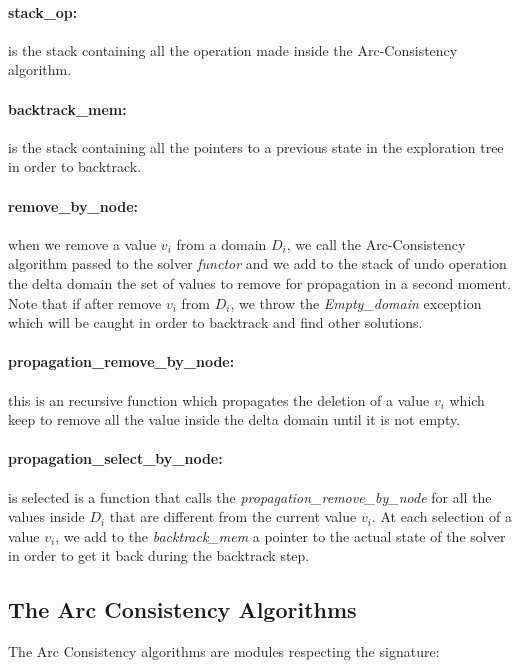 \documentclass{rapport}
\begin{document}
\paragraph{stack\_op:} is the stack containing all the operation made inside the Arc-Consistency algorithm.

\paragraph{backtrack\_mem:} is the stack containing all the pointers to a previous state in the exploration tree in order to backtrack.

\paragraph{remove\_by\_node:} when we remove a value $v_i$ from a domain $D_i$, we call the Arc-Consistency algorithm passed to the solver \textit{functor} and we add to the stack of undo operation the delta domain the set of values to remove for propagation in a second moment. Note that if after remove $v_i$ from $D_i$, we throw the \textit{Empty\_domain} exception which will be caught in order to backtrack and find other solutions.

\paragraph{propagation\_remove\_by\_node:} this is an recursive function which propagates the deletion of a value $v_i$ which keep to remove all the value inside the delta domain until it is not empty.

\paragraph{propagation\_select\_by\_node:} is selected is a function that calls the \textit{propagation\_remove\_by\_node} for all the values inside $D_i$ that are different from the current value $v_i$. At each selection of a value $v_i$, we add to the \textit{backtrack\_mem} a pointer to the actual state of the solver in order to get it back during the backtrack step.

\subsection{The Arc Consistency Algorithms}
The Arc Consistency algorithms are modules respecting the signature:
\end{document}
